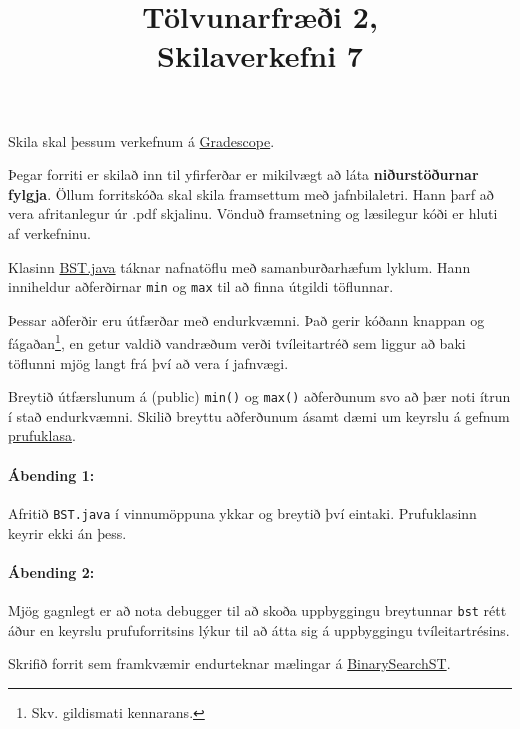 \documentclass{article}
\title{Tölvunarfræði 2, \semester \\ Skilaverkefni 7}
\author{}
\begin{document}
\maketitle
{}

Skila skal þessum verkefnum á \href{https://gradescope.com/courses/14122}{Gradescope}.

Þegar forriti er skilað inn til yfirferðar er mikilvægt að láta \textbf{niðurstöðurnar fylgja}. Öllum forritskóða skal skila framsettum með jafnbilaletri. Hann þarf að vera afritanlegur úr .pdf skjalinu. Vönduð framsetning og læsilegur kóði er hluti af verkefninu.

\question

Klasinn \href{https://algs4.cs.princeton.edu/code/edu/princeton/cs/algs4/BST.java.html}{BST.java} táknar nafnatöflu með samanburðarhæfum lyklum. Hann inniheldur aðferðirnar \texttt{min} og \texttt{max} til að finna útgildi töflunnar.

Þessar aðferðir eru útfærðar með endurkvæmni. Það gerir kóðann knappan og fágaðan\footnote{Skv. gildismati kennarans.}, en getur valdið vandræðum verði tvíleitartréð sem liggur að baki töflunni mjög langt frá því að vera í jafnvægi.

Breytið útfærslunum á (public) \texttt{min()} og \texttt{max()} aðferðunum svo að þær noti ítrun í stað endurkvæmni. Skilið breyttu aðferðunum ásamt dæmi um keyrslu á gefnum \href{https://github.com/Ernir/kennsluefni/tree/master/T2/Code/w8/stringsearchtree.java}{prufuklasa}.

\paragraph{Ábending 1:} Afritið \texttt{BST.java} í vinnumöppuna ykkar og breytið því eintaki. Prufuklasinn keyrir ekki án þess.

\paragraph{Ábending 2:} Mjög gagnlegt er að nota debugger til að skoða uppbyggingu breytunnar \texttt{bst} rétt áður en keyrslu prufuforritsins lýkur til að átta sig á uppbyggingu tvíleitartrésins.

\question

Skrifið forrit sem framkvæmir endurteknar mælingar á \href{https://algs4.cs.princeton.edu/code/edu/princeton/cs/algs4/BinarySearchST.java.html}{BinarySearchST}.
\end{document}
